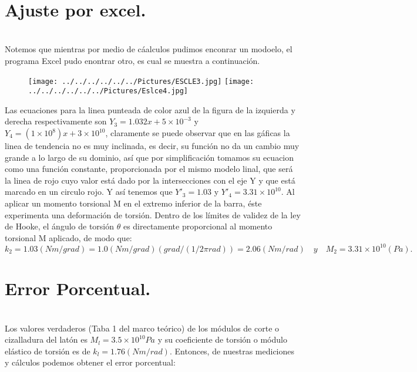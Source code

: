 \documentclass[10pt,a4paper]{article}
\begin{document}
\\
\section*{Ajuste por excel.}\\
Notemos que mientras por medio de c\'{a}alculos pudimos enconrar un modoelo, el programa Excel pudo enontrar otro, es cual se muestra a continuaci\'{o}n.

\begin{figure}[hbtp]
 \centering
\texttt{[image: ../../../../../../Pictures/ESCLE3.jpg]} 
\texttt{[image: ../../../../../../Pictures/Eslce4.jpg]}  
\end{figure}
Las ecuaciones para la linea punteada de color azul de la figura de la izquierda y derecha respectivamente son ${ Y }_{ 3 }=1.032x+5\times { 10 }^{ -3 }$ y ${ Y }_{ 4 }=(1\times { 10 }^{ 8 } )x+ 3\times { 10 }^{ 10 }$, claramente se puede observar que en las g\'{a}ficas la linea de tendencia no es muy inclinada, es decir, su funci\'{o}n no da un cambio muy grande a lo largo de su dominio, as\'{i} que por simplificaci\'{o}n tomamos su ecuacion como una funci\'{o}n constante, proporcionada por el mismo modelo linal, que ser\'{a} la linea de rojo cuyo valor est\'{a} dado por la intersecciones con el eje Y y que est\'{a} marcado en un circulo rojo. Y as\'{i} tenemos que ${ Y }'_{ 3 }= 1.03$ y ${ Y }'_{ 4 }=3.31\times { 10 }^{ 10 }$. Al aplicar un momento torsional M en el extremo inferior de la barra, \'{e}ste experimenta una deformaci\'{o}n de torsi\'{o}n. Dentro de los l\'{i}mites de validez de la ley de Hooke, el \'{a}ngulo de torsi\'{o}n $\theta$ es directamente proporcional al momento torsional M aplicado, de modo que:
\[{ k }_{ 2 }= 1.03(Nm/grad)=1.0(Nm/grad)\left( { grad }/{ \left( { 1 }/{ 2\pi rad } \right)  } \right) =2.06(Nm/rad) \quad y \quad { M }_{ 2 }=3.31\times { 10 }^{ 10 }(Pa).\]
 
\section*{Error Porcentual.}\\
Los valores verdaderos (Taba 1 del marco te\'{o}rico) de los m\'{o}dulos de corte o cizalladura del lat\'{o}n es ${ M }_{ l }=3.5\times { 10 }^{ 10 }Pa$ y su  coeficiente de torsi\'{o}n o m\'{o}dulo el\'{a}stico de torsi\'{o}n es de ${ k }_{ l }=1.76(Nm/rad)$. Entonces, de nuestras mediciones y c\'{a}lculos podemos obtener el error porcentual:
\end{document}

